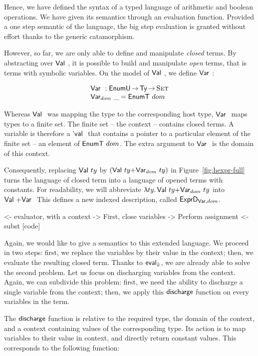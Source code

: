 Hence, we have defined the syntax of a typed language of arithmetic
and boolean operations. We have given its semantics through an
evaluation function. Provided a one step semantic of the language, the
big step evaluation is granted without effort thanks to the generic
catamorphism. 

However, so far, we are only able to define and manipulate
\emph{closed} terms. By abstracting over $\Val{}$, it is possible to
build and manipulate \emph{open} terms, that is terms with symbolic
variables. On the model of $\Val{}$, we define $\Var{}{}$:

\[\stk{
\Var{}{} : \EnumU \To \Ty \To \Set \\
\Var{dom}{\_} = \EnumT{dom}
}\]

Whereas $\Val{}$ was mapping the type to the corresponding host type,
$\Var{}{}$ maps types to a finite set. The finite set -- the context
-- contains closed terms. A variable is therefore a $\Eval{}$ that
contains a pointer to a particular element of the finite set -- an
element of $\EnumT{dom}$. The extra argument to $\Var{}{}$ is the
domain of this context.

Consequently, replacing $\Val{ty}$ by
$(\SUM{\Val{ty}}{\Var{dom}{ty}})$ in Figure~\ref{fig:hexpr-full} turns
the language of closed term into a language of opened terms with
constants. For readability, we will abbreviate $\LAM{ty}
\SUM{\Val{ty}}{\Var{dom}{ty}}$ into $\SUM{\Val{}}{\Var{}{}}$  This defines a new
indexed description, called $\HExprVarD{dom}$.

\begin{wstructure}
        <- evaluator, with a context
            -> First, close variables
                -> Perform assignment
                <- subst [code]
\end{wstructure}

\newcommand{\discharge}{\F{discharge}}

Again, we would like to give a semantics to this extended language. We
proceed in two steps: first, we replace the variables by their value
in the context; then, we evaluate the resulting closed term. Thanks to
$\evalH$, we are already able to solve the second problem. Let us
focus on discharging variables from the context. Again, we can
subdivide this problem: first, we need the ability to discharge a
single variable from the context; then, we apply this $\discharge$
function on every variables in the term.

The $\discharge$ function is relative to the required type, the domain
of the context, and a context containing values of the corresponding
type. Its action is to map variables to their value in context, and
directly return constant values. This corresponds to the following
function:

